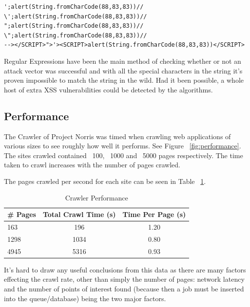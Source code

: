 \documentclass[12pt,a4paper]{article}
\begin{document}
\begin{lstlisting}
';alert(String.fromCharCode(88,83,83))//
\';alert(String.fromCharCode(88,83,83))//
";alert(String.fromCharCode(88,83,83))//
\";alert(String.fromCharCode(88,83,83))//
--></SCRIPT>">'><SCRIPT>alert(String.fromCharCode(88,83,83))</SCRIPT>
\end{lstlisting}

Regular Expressions have been the main method of checking whether or not an attack vector was successful and with all the special characters in the string it's proven impossible to match the string in the wild.  Had it been possible, a whole host of extra XSS vulnerabilities could be detected by the algorithms.

\subsection{Performance}
The Crawler of Project Norris was timed when crawling web applications of various sizes to see roughly how well it performs.  See Figure ~\ref{fig:performance}.
The sites crawled contained ~100, ~1000 and ~5000 pages respectively.  The time taken to crawl increases with the number of pages crawled.

The pages crawled per second for each site can be seen in Table ~\ref{table:performance}.

\begin{center}
    \begin{table}
        \caption{Crawler Performance}
        \begin{center}
            \begin{tabular}{ | l | c | c | }
                \hline
                \# Pages & Total Crawl Time (s) & Time Per Page (s) \\ \hline
                163 & 196 & 1.20 \\ \hline
                1298 & 1034 & 0.80 \\ \hline
                4945 & 5316 & 0.93 \\ 
                \hline
            \end{tabular}
        \end{center}
        \label{table:performance}
    \end{table}
\end{center}

It's hard to draw any useful conclusions from this data as there are many factors effecting the crawl rate, other than simply the number of pages: network latency and the number of points of interest found (because then a job must be inserted into the queue/database) being the two major factors.
\end{document}
